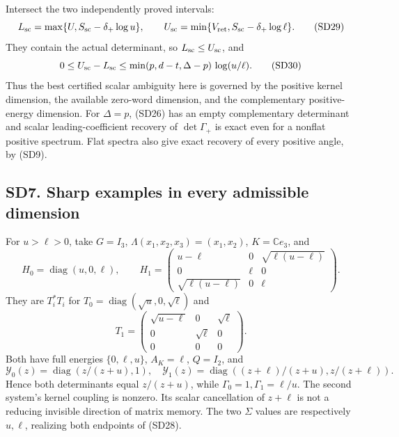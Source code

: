 \documentclass[11pt]{article}
\begin{document}
Intersect the two independently proved intervals: \[
L_{\rm sc}=\max\{U,S_{\rm sc}-\delta_+\log u\},\qquad
U_{\rm sc}=\min\{V_{\rm ret},S_{\rm sc}-\delta_+\log\ell\}.
\tag{SD29}
\] They contain the actual determinant, so \(L_{\rm sc}\le U_{\rm sc}\), and \[
0\le U_{\rm sc}-L_{\rm sc}
\le \min(p,d-t,\Delta-p)\,\log(u/\ell).
\tag{SD30}
\] Thus the best certified scalar ambiguity here is governed by the positive kernel dimension, the available zero-word dimension, and the complementary positive-energy dimension. For \(\Delta=p\), (SD26) has an empty complementary determinant and scalar leading-coefficient recovery of \(\det\Gamma_+\) is exact even for a nonflat positive spectrum. Flat spectra also give exact recovery of every positive angle, by (SD9).

\subsection{SD7. Sharp examples in every admissible dimension}\label{sd7.-sharp-examples-in-every-admissible-dimension}

For \(u>\ell>0\), take \(G=I_3\), \(\Lambda(x_1,x_2,x_3)=(x_1,x_2)\), \(K=\mathbb Ce_3\), and \[
H_0=\operatorname{diag}(u,0,\ell),\qquad
H_1=\begin{pmatrix}
u-\ell&0&\sqrt{\ell(u-\ell)}\\
0&\ell&0\\
\sqrt{\ell(u-\ell)}&0&\ell
\end{pmatrix}.
\tag{SD31}
\] They are \(T_i^*T_i\) for \(T_0=\operatorname{diag}(\sqrt u,0,\sqrt\ell)\) and \[
T_1=\begin{pmatrix}\sqrt{u-\ell}&0&\sqrt\ell\\
0&\sqrt\ell&0\\0&0&0\end{pmatrix}.
\] Both have full energies \(\{0,\ell,u\}\), \(A_K=\ell\), \(Q=I_2\), and \[
\mathscr Y_0(z)=\operatorname{diag}(z/(z+u),1),\quad
\mathscr Y_1(z)=\operatorname{diag}((z+\ell)/(z+u),z/(z+\ell)).
\tag{SD32}
\] Hence both determinants equal \(z/(z+u)\), while \(\Gamma_0=1,\Gamma_1=\ell/u\). The second system's kernel coupling is nonzero. Its scalar cancellation of \(z+\ell\) is not a reducing invisible direction of matrix memory. The two \(\Sigma\) values are respectively \(u,\ell\), realizing both endpoints of (SD28).
\end{document}
